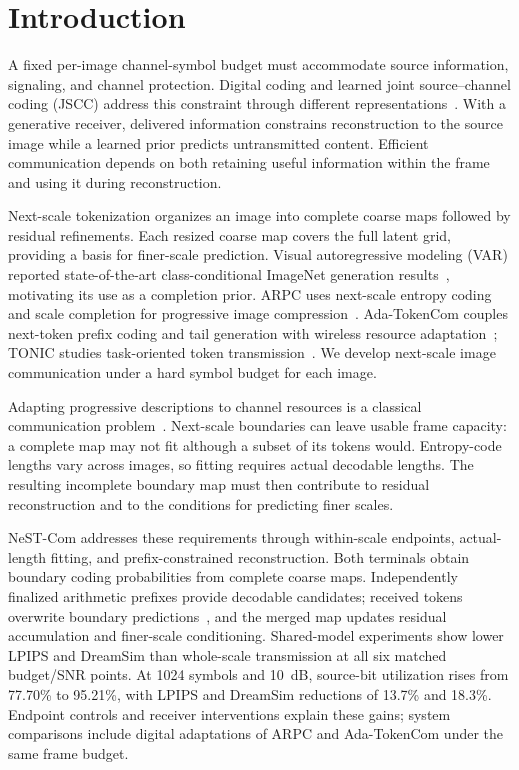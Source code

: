 \section{Introduction}
A fixed per-image channel-symbol budget must accommodate source information, signaling, and channel protection. Digital coding and learned joint source--channel coding (JSCC) address this constraint through different representations~\cite{deepjscc,swinjscc}. With a generative receiver, delivered information constrains reconstruction to the source image while a learned prior predicts untransmitted content. Efficient communication depends on both retaining useful information within the frame and using it during reconstruction.

Next-scale tokenization organizes an image into complete coarse maps followed by residual refinements. Each resized coarse map covers the full latent grid, providing a basis for finer-scale prediction. Visual autoregressive modeling (VAR) reported state-of-the-art class-conditional ImageNet generation results~\cite{var}, motivating its use as a completion prior. ARPC uses next-scale entropy coding and scale completion for progressive image compression~\cite{arpc}. Ada-TokenCom couples next-token prefix coding and tail generation with wireless resource adaptation~\cite{adatokencom}; TONIC studies task-oriented token transmission~\cite{tonic}. We develop next-scale image communication under a hard symbol budget for each image.

Adapting progressive descriptions to channel resources is a classical communication problem~\cite{chande}. Next-scale boundaries can leave usable frame capacity: a complete map may not fit although a subset of its tokens would. Entropy-code lengths vary across images, so fitting requires actual decodable lengths. The resulting incomplete boundary map must then contribute to residual reconstruction and to the conditions for predicting finer scales.

NeST-Com addresses these requirements through within-scale endpoints, actual-length fitting, and prefix-constrained reconstruction. Both terminals obtain boundary coding probabilities from complete coarse maps. Independently finalized arithmetic prefixes provide decodable candidates; received tokens overwrite boundary predictions~\cite{var}, and the merged map updates residual accumulation and finer-scale conditioning. Shared-model experiments show lower LPIPS and DreamSim than whole-scale transmission at all six matched budget/SNR points. At 1024 symbols and 10~dB, source-bit utilization rises from 77.70\% to 95.21\%, with LPIPS and DreamSim reductions of 13.7\% and 18.3\%. Endpoint controls and receiver interventions explain these gains; system comparisons include digital adaptations of ARPC and Ada-TokenCom under the same frame budget.

